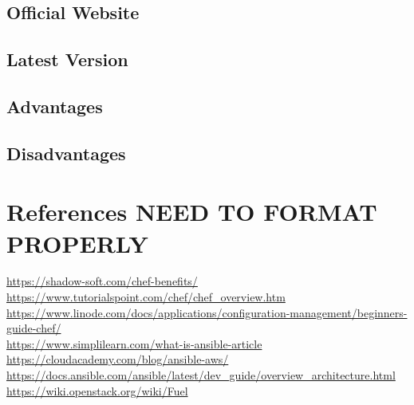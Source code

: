 \documentclass[a4paper, 12pt]{article}
\begin{document}
\subsection{Official Website}
\subsection{Latest Version}
\subsection{Advantages}
\subsection{Disadvantages}

\newpage
\section{References NEED TO FORMAT PROPERLY}
\href{https://shadow-soft.com/chef-benefits/}{https://shadow-soft.com/chef-benefits/}\\
\href{https://www.tutorialspoint.com/chef/chef_overview.htm}{https://www.tutorialspoint.com/chef/chef\_overview.htm}\\
\href{https://www.linode.com/docs/applications/configuration-management/beginners-guide-chef/}{https://www.linode.com/docs/applications/configuration-management/beginners-guide-chef/}\\
\href{https://www.simplilearn.com/what-is-ansible-article}{https://www.simplilearn.com/what-is-ansible-article}\\
\href{https://cloudacademy.com/blog/ansible-aws/}{https://cloudacademy.com/blog/ansible-aws/}\\
\href{https://docs.ansible.com/ansible/latest/dev_guide/overview_architecture.html}{https://docs.ansible.com/ansible/latest/dev\_guide/overview\_architecture.html}\\
\href{https://wiki.openstack.org/wiki/Fuel}{https://wiki.openstack.org/wiki/Fuel}\\
\end{document}
